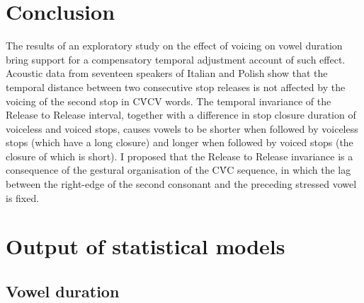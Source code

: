 \documentclass[preprint]{JASAnew}
\begin{document}
\hypertarget{conclusion}{%
\section{Conclusion}\label{conclusion}}

The results of an exploratory study on the effect of voicing on vowel
duration bring support for a compensatory temporal adjustment account of
such effect. Acoustic data from seventeen speakers of Italian and Polish
show that the temporal distance between two consecutive stop releases is
not affected by the voicing of the second stop in CV́CV words. The
temporal invariance of the Release to Release interval, together with a
difference in stop closure duration of voiceless and voiced stops,
causes vowels to be shorter when followed by voiceless stops (which have
a long closure) and longer when followed by voiced stops (the closure of
which is short). I proposed that the Release to Release invariance is a
consequence of the gestural organisation of the CV́C sequence, in which
the lag between the right-edge of the second consonant and the preceding
stressed vowel is fixed.

\appendix

\hypertarget{output-of-statistical-models}{%
\section{Output of statistical
models}\label{output-of-statistical-models}}

\label{a:stats}

\hypertarget{vowel-duration-1}{%
\subsection{Vowel duration}\label{vowel-duration-1}}
\end{document}
